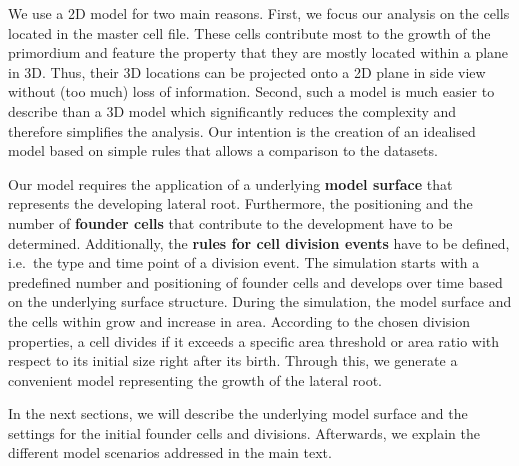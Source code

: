 \documentclass[11pt,a4paper, final]{article}
\begin{document}
We use a 2D model for two main reasons. First, we focus our analysis on the cells located in the master cell file. These cells contribute most to the growth of the primordium and feature the property that they are mostly located within a plane in 3D. Thus, their 3D locations can be projected onto a 2D plane in side view without (too much) loss of information. Second, such a model is much easier to describe than a 3D model which significantly reduces the complexity and therefore simplifies the analysis. Our intention is the creation of an idealised model based on simple rules that allows a comparison to the datasets.

\noindent
Our model requires the application of a underlying \textbf{model surface} that represents the developing lateral root. Furthermore, the positioning and the number of \textbf{founder cells} that contribute to the development have to be determined. Additionally, the \textbf{rules for cell division events} have to be defined, i.e.~the type and time point of a division event. The simulation starts with a predefined number and positioning of founder cells and develops over time based on the underlying surface structure. During the simulation, the model surface and the cells within grow and increase in area. According to the chosen division properties, a cell divides if it exceeds a specific area threshold or area ratio with respect to its initial size right after its birth. Through this, we generate a convenient model representing the growth of the lateral root.

In the next sections, we will describe the underlying model surface and the settings for the initial founder cells and divisions. Afterwards, we explain the different model scenarios addressed in the main text.
\end{document}
